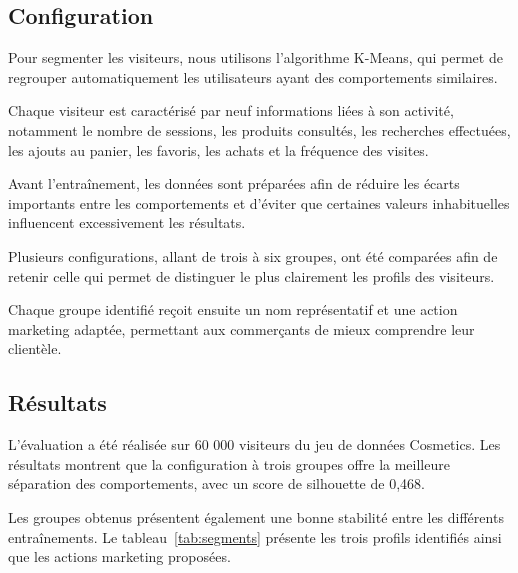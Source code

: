 \subsection{Configuration}

Pour segmenter les visiteurs, nous utilisons l'algorithme K-Means, qui permet de regrouper automatiquement les utilisateurs ayant des comportements similaires.

Chaque visiteur est caractérisé par neuf informations liées à son activité, notamment le nombre de sessions, les produits consultés, les recherches effectuées, les ajouts au panier, les favoris, les achats et la fréquence des visites.

Avant l'entraînement, les données sont préparées afin de réduire les écarts importants entre les comportements et d'éviter que certaines valeurs inhabituelles influencent excessivement les résultats.

Plusieurs configurations, allant de trois à six groupes, ont été comparées afin de retenir celle qui permet de distinguer le plus clairement les profils des visiteurs.

Chaque groupe identifié reçoit ensuite un nom représentatif et une action marketing adaptée, permettant aux commerçants de mieux comprendre leur clientèle.

\subsection{Résultats}

L'évaluation a été réalisée sur 60 000 visiteurs du jeu de données Cosmetics. Les résultats montrent que la configuration à trois groupes offre la meilleure séparation des comportements, avec un score de silhouette de 0,468.

Les groupes obtenus présentent également une bonne stabilité entre les différents entraînements. Le tableau~\ref{tab:segments} présente les trois profils identifiés ainsi que les actions marketing proposées.

